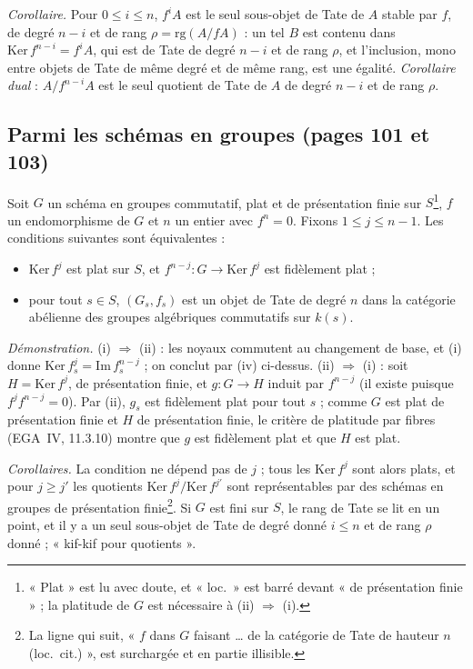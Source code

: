 \documentclass[11pt,a4paper]{article}
\begin{document}
\emph{Corollaire.} Pour $0 \leq i \leq n$, $f^{i}A$ est le seul
sous-objet de Tate de $A$ stable par $f$, de degré $n - i$ et de rang
$\rho = \mathrm{rg}(A/fA)$ : un tel $B$ est contenu dans $\mathrm{Ker}\,
f^{n-i} = f^{i}A$, qui est de Tate de degré $n - i$ et de rang $\rho$,
et l'inclusion, mono entre objets de Tate de même degré et de même rang,
est une égalité. \emph{Corollaire dual} : $A/f^{n-i}A$ est le seul quotient
de Tate de $A$ de degré $n - i$ et de rang $\rho$.

\subsection*{Parmi les schémas en groupes (pages 101 et 103)}

Soit $G$ un schéma en groupes commutatif, plat et de présentation finie
sur $S$\footnote{« Plat » est lu avec doute, et « loc.\ » est barré
devant « de présentation finie » ; la platitude de $G$ est nécessaire à
(ii) $\Rightarrow$ (i).}, $f$ un endomorphisme de $G$ et $n$ un entier
avec $f^{n} = 0$. Fixons $1 \leq j \leq n-1$. Les conditions suivantes
sont équivalentes :
\begin{itemize}
  \item[(i)] $\mathrm{Ker}\, f^{j}$ est plat sur $S$, et $f^{n-j} \colon G
  \to \mathrm{Ker}\, f^{j}$ est fidèlement plat ;
  \item[(ii)] pour tout $s \in S$, $(G_s, f_s)$ est un objet de Tate de
  degré $n$ dans la catégorie abélienne des groupes algébriques
  commutatifs sur $k(s)$.
\end{itemize}
\emph{Démonstration.} (i) $\Rightarrow$ (ii) : les noyaux commutent au
changement de base, et (i) donne $\mathrm{Ker}\, f_s^{j} = \mathrm{Im}\,
f_s^{n-j}$ ; on conclut par (iv) ci-dessus. (ii) $\Rightarrow$ (i) : soit
$H = \mathrm{Ker}\, f^{j}$, de présentation finie, et $g \colon G \to H$
induit par $f^{n-j}$ (il existe puisque $f^{j}f^{n-j} = 0$). Par (ii),
$g_s$ est fidèlement plat pour tout $s$ ; comme $G$ est plat de
présentation finie et $H$ de présentation finie, le critère de platitude
par fibres (EGA~IV, 11.3.10) montre que $g$ est fidèlement plat et que
$H$ est plat.

\emph{Corollaires.} La condition ne dépend pas de $j$ ; tous les
$\mathrm{Ker}\, f^{j}$ sont alors plats, et pour $j \geq j'$ les quotients
$\mathrm{Ker}\, f^{j}/\mathrm{Ker}\, f^{j'}$ sont représentables par des
schémas en groupes de présentation finie\footnote{La ligne qui suit, «
$f$ dans $G$ faisant … de la catégorie de Tate de hauteur $n$ (loc.\
cit.) », est surchargée et en partie illisible.}. Si $G$ est fini sur
$S$, le rang de Tate se lit en un point, et il y a un seul sous-objet de
Tate de degré donné $i \leq n$ et de rang $\rho$ donné ; « kif-kif pour
quotients ».
\end{document}
